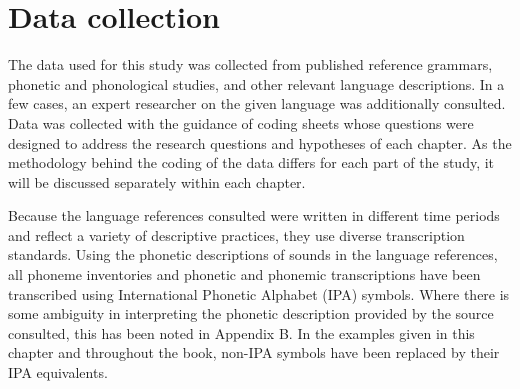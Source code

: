 \section{Data collection}\label{sec:2.5}

  The data used for this study was collected from published reference grammars, phonetic and phonological studies, and other relevant language descriptions. In a few cases, an expert researcher on the given language was additionally consulted. Data was collected with the guidance of coding sheets whose questions were designed to address the research questions and hypotheses of each chapter. As the methodology behind the coding of the data differs for each part of the study, it will be discussed separately within each chapter.

  Because the language references consulted were written in different time periods and reflect a variety of descriptive practices, they use diverse transcription standards. Using the phonetic descriptions of sounds in the language references, all phoneme inventories and phonetic and phonemic transcriptions have been transcribed using International Phonetic Alphabet (IPA) symbols. Where there is some ambiguity in interpreting the phonetic description provided by the source consulted, this has been noted in Appendix B. In the examples given in this chapter and throughout the book, non-IPA symbols have been replaced by their IPA equivalents.


